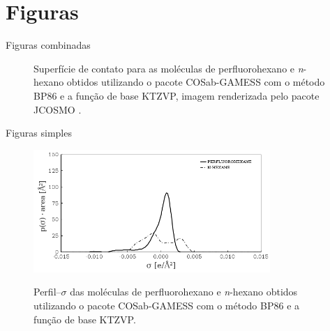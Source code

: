 \section{Figuras}
Figuras combinadas
\begin{figure}[htb] 
\centering
{}
\caption{Superfície de contato para as moléculas de perfluorohexano e \emph{n}-hexano
obtidos utilizando o pacote COSab-GAMESS \cite{Gregerson2003} com o método BP86
e a função de base KTZVP, imagem renderizada pelo pacote JCOSMO
\cite{Gerber2010}.}
\label{fig:contact}
\end{figure}

Figuras simples
\begin{figure}[htb]	
\centering
{\includegraphics[width=0.8\textwidth]{img/COSMO-SAC.png}}
\caption{Perfil--$\sigma$ das moléculas de perfluorohexano e \emph{n}-hexano
obtidos utilizando o pacote COSab-GAMESS \cite{Gregerson2003} com o método BP86
e a função de base KTZVP.}
\label{fig:sigma_COSMO}
\end{figure}

